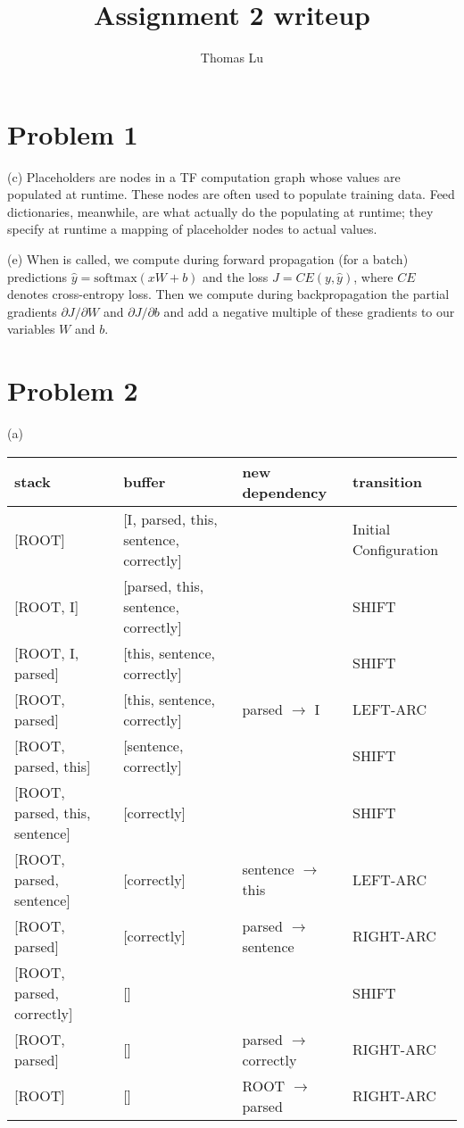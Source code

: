 \documentclass{article}
\title{Assignment 2 writeup}
\author{Thomas Lu}
\date{}
\begin{document}
\maketitle
\section{Problem 1}
(c) Placeholders are nodes in a TF computation graph whose values are populated at runtime. These nodes are often used to populate training data. Feed dictionaries, meanwhile, are what actually do the populating at runtime; they specify at runtime a mapping of placeholder nodes to actual values.

(e) When  is called, we compute during forward propagation (for a batch) predictions $\hat{y} = \text{softmax}(xW + b)$ and the loss $J = CE(y, \hat{y})$, where $CE$ denotes cross-entropy loss. Then we compute during backpropagation the partial gradients $\partial J/\partial W$ and $\partial J/\partial b$ and add a negative multiple of these gradients to our variables $W$ and $b$.

\section{Problem 2}
(a)
\begin{center}
\footnotesize
\begin{tabular}{l|l|l|l}
stack & buffer & new dependency & transition\\
\hline
{[ROOT]} & [I, parsed, this, sentence, correctly] & & Initial Configuration \\
{[ROOT, I]} & [parsed, this, sentence, correctly] & & SHIFT \\
{[ROOT, I, parsed]} & [this, sentence, correctly] & & SHIFT \\
{[ROOT, parsed]} & [this, sentence, correctly] & parsed $\rightarrow$ I & LEFT-ARC \\
{[ROOT, parsed, this]} & [sentence, correctly] & & SHIFT \\
{[ROOT, parsed, this, sentence]} & [correctly] & & SHIFT \\
{[ROOT, parsed, sentence]} & [correctly] & sentence $\rightarrow$ this & LEFT-ARC \\
{[ROOT, parsed]} & [correctly] & parsed $\rightarrow$ sentence & RIGHT-ARC \\
{[ROOT, parsed, correctly]} & [] & & SHIFT \\
{[ROOT, parsed]} & [] & parsed $\rightarrow$ correctly & RIGHT-ARC \\
{[ROOT]} & [] & ROOT $\rightarrow$ parsed & RIGHT-ARC \\
\end{tabular}
\end{center}
\end{document}
